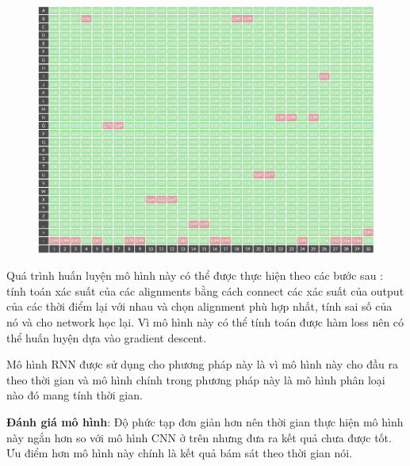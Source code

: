 \documentclass{article}
\begin{document}
	\begin{figure}[H]
		\centering
		\includegraphics[width=1\linewidth]{images/b3_7.png}
		\label{fig:writing-thesis}
	\end{figure} 

	Quá trình huấn luyện mô hình này có thể được thực hiện theo các bước sau : tính toán xác suất của các alignments bằng cách connect các xác suất của output của các thời điểm lại với nhau và chọn alignment phù hợp nhất, tính sai số của nó và cho network học lại. Vì mô hình này có thể tính toán được hàm loss nên có thể huấn luyện dựa vào gradient descent.
	
	Mô hình RNN được sử dụng cho phương pháp này là vì mô hình này cho đầu ra theo thời gian và mô hình chính trong phương pháp này là mô hình phân loại nào đó mang tính thời gian.
		
	\textbf{Đánh giá mô hình}: Độ phức tạp đơn giản hơn nên thời gian thực hiện mô hình này ngắn hơn so với mô hình CNN ở trên nhưng đưa ra kết quả chưa được tốt. Ưu điểm hơn mô hình này chính là kết quả bám sát theo thời gian nói.
	
\end{document}
